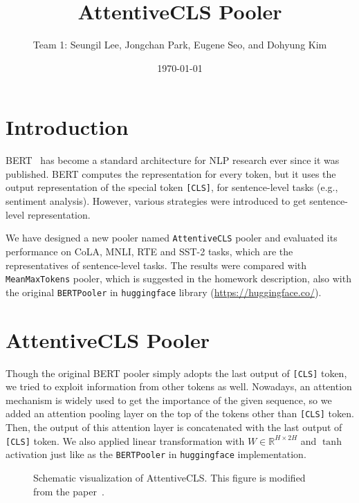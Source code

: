 \documentclass[UTF8]{article}
\title{AttentiveCLS Pooler}
\author{
  Team 1:  %
  Seungil Lee, Jongchan Park, Eugene Seo, and Dohyung Kim %
}
\date{\today}
\begin{document}
\maketitle

\section{Introduction}

BERT~\cite{devlin-etal-2019-bert} has become a standard architecture for NLP research ever since it was published. BERT computes the representation for every token, but it uses the output representation of the special token \texttt{[CLS]}, for sentence-level tasks (e.g., sentiment analysis). However, various strategies were introduced to get sentence-level representation.

We have designed a new pooler named \texttt{AttentiveCLS} pooler and evaluated its performance on CoLA, MNLI, RTE and SST-2 tasks, which are the representatives of sentence-level tasks. The results were compared with \texttt{MeanMaxTokens} pooler, which is suggested in the homework description, also with the original \texttt{BERTPooler} in \texttt{huggingface} library (\url{https://huggingface.co/}).

\section{AttentiveCLS Pooler}
Though the original BERT pooler simply adopts the last output of \texttt{[CLS]} token, we tried to exploit information from other tokens as well. Nowadays, an attention mechanism is widely used to get the importance of the given sequence, so we added an attention pooling layer on the top of the tokens other than \texttt{[CLS]} token. Then, the output of this attention layer is concatenated with the last output of \texttt{[CLS]} token. We also applied linear transformation with $W \in \mathbb{R}^{H \times 2H}$ and $\tanh$ activation just like as the \texttt{BERTPooler} in \texttt{huggingface} implementation.

\begin{figure}[htp] 
  \caption{Schematic visualization of AttentiveCLS. This figure is modified from the paper~\cite{lehevcka2020adjusting}.}
  \end{figure} 
\end{document}
